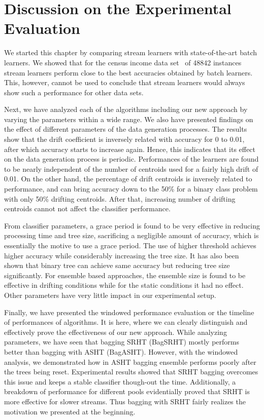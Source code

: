 \section{Discussion on the Experimental Evaluation}
We started this chapter by comparing stream learners with state-of-the-art batch learners. We showed that for the census income data set~\cite{ron:adultds} of 48842 instances stream learners perform close to the best accuracies obtained by batch learners. This, however, cannot be used to conclude that stream learners would always show such a performance for other data sets.

Next, we have analyzed each of the algorithms including our new approach by varying the parameters within a wide range. We also have presented findings on the effect of different parameters of the data generation processes. The results show that the drift coefficient is inversely related with accuracy for 0 to 0.01, after which accuracy starts to increase again. Hence, this indicates that its effect on the data generation process is periodic. Performances of the learners are found to be nearly independent of the number of centroids used for a fairly high drift of 0.01. On the other hand, the percentage of drift centroids is inversely related to performance, and can bring accuracy down to the 50\% for a binary class problem with only 50\% drifting centroids. After that, increasing number of drifting centroids cannot not affect the classifier performance. 

From classifier parameters, a grace period is found to be very effective in reducing processing time and tree size, sacrificing a negligible amount of accuracy, which is essentially the motive to use a grace period. The use of higher threshold achieves higher accuracy while considerably increasing the tree size. It has also been shown that binary tree can achieve same accuracy but reducing tree size significantly. For ensemble based approaches, the ensemble size is found to be effective in drifting conditions while for the static conditions it had no effect. Other parameters have very little impact in our experimental setup.

Finally, we have presented the windowed performance evaluation or the timeline of performances of algorithms. It is here, where we can clearly distinguish and effectively prove the effectiveness of our new approach. While analyzing parameters, we have seen that bagging SRHT (BagSRHT) mostly performs better than bagging with ASHT (BagASHT). However, with the windowed analysis, we demonstrated how in ASHT bagging ensemble performs poorly after the trees being reset. Experimental results showed that SRHT bagging overcomes this issue and keeps a stable classifier though-out the time. Additionally, a breakdown of performance for different pools evidentially proved that SRHT is more effective for slower streams. Thus bagging with SRHT fairly realizes the motivation we presented at the beginning.
